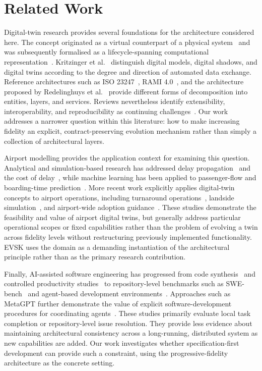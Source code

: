 \documentclass[runningheads]{llncs}
\begin{document}
\section{Related Work}\label{sec:related}

Digital-twin research provides several foundations for the architecture considered here. The concept originated as a virtual counterpart of a physical system~\cite{grieves2017} and was subsequently formalised as a lifecycle-spanning computational representation~\cite{glaessgen2012}. Kritzinger et al.~\cite{kritzinger2018} distinguish digital models, digital shadows, and digital twins according to the degree and direction of automated data exchange. Reference architectures such as ISO 23247~\cite{iso23247}, RAMI 4.0~\cite{rami40}, and the architecture proposed by Redelinghuys et al.~\cite{redelinghuys2019} provide different forms of decomposition into entities, layers, and services. Reviews nevertheless identify extensibility, interoperability, and reproducibility as continuing challenges~\cite{jones2020,mohammadi2017}. Our work addresses a narrower question within this literature: how to make increasing fidelity an explicit, contract-preserving evolution mechanism rather than simply a collection of architectural layers.

Airport modelling provides the application context for examining this question. Analytical and simulation-based research has addressed delay propagation~\cite{pyrgiotis2013} and the cost of delay~\cite{cook2009}, while machine learning has been applied to passenger-flow and boarding-time prediction~\cite{ke2017,schultz2019}. More recent work explicitly applies digital-twin concepts to airport operations, including turnaround operations~\cite{conde2024}, landside simulation~\cite{palasca2025}, and airport-wide adoption guidance~\cite{acrp2024}. These studies demonstrate the feasibility and value of airport digital twins, but generally address particular operational scopes or fixed capabilities rather than the problem of evolving a twin across fidelity levels without restructuring previously implemented functionality. EVSK uses the domain as a demanding instantiation of the architectural principle rather than as the primary research contribution.

Finally, AI-assisted software engineering has progressed from code synthesis~\cite{chen2021codex} and controlled productivity studies~\cite{peng2023copilot} to repository-level benchmarks such as SWE-bench~\cite{swebench2024} and agent-based development environments~\cite{yang2024sweagent}. Approaches such as MetaGPT further demonstrate the value of explicit software-development procedures for coordinating agents~\cite{hong2024metagpt}. These studies primarily evaluate local task completion or repository-level issue resolution. They provide less evidence about maintaining architectural consistency across a long-running, distributed system as new capabilities are added. Our work investigates whether specification-first development can provide such a constraint, using the progressive-fidelity architecture as the concrete setting.
\end{document}
